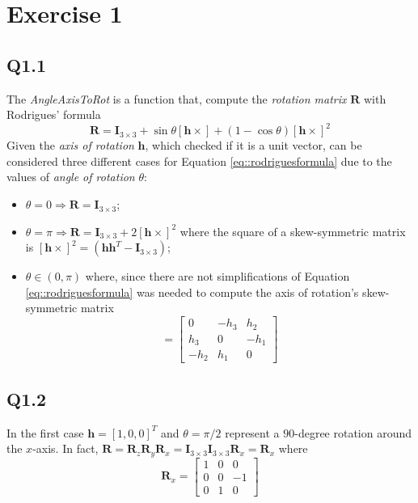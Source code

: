 \section{Exercise 1} \label{P1}
\subsection{Q1.1}
The \textit{AngleAxisToRot} is a function that, compute the \textit{rotation matrix} $\mathbf{R}$ with Rodrigues' formula 
\begin{equation}
	\mathbf{R} = \mathbf{I}_{3\times 3} + \sin{\theta}[\mathbf{h}\times] + (1 - \cos \theta)[\mathbf{h}\times]^2
	\label{eq::rodriguesformula}
\end{equation}
Given the \textit{axis of rotation} $\mathbf{h}$, which checked if it is a unit vector, can be considered three different cases for Equation \ref{eq::rodriguesformula} due to the values of \textit{angle of rotation} $\theta$:
\begin{itemize}
	\item $\theta = 0 \Rightarrow \mathbf{R} = \mathbf{I}_{3\times 3}$\space;
	\item $\theta = \pi \Rightarrow \mathbf{R} = \mathbf{I}_{3\times 3} + 2 [\mathbf{h}\times]^2$ where the square of a skew-symmetric matrix is $[\mathbf{h}\times]^2 = (\mathbf{h}\mathbf{h}^T -\mathbf{I}_{3\times 3})$\space;
	\item $\theta \in (0, \pi)$ where, since there are not simplifications of Equation \ref{eq::rodriguesformula} was needed to compute the axis of rotation's skew-symmetric matrix
		\begin{equation*}
			[\mathbf{h}\times] = \begin{bmatrix}
				0 & -h_3 & h_2 \\
				h_3 & 0 & -h_1 \\
				-h_2 & h_1 & 0
			\end{bmatrix}
	\end{equation*}
\end{itemize}

\subsection{Q1.2}
In the first case $\mathbf{h} = [1, 0, 0]^T$ and $\theta = \pi/2$ represent a $90$-degree rotation around the $x$-axis. In fact, $\mathbf{R}= \mathbf{R}_z\mathbf{R}_y\mathbf{R}_x =\mathbf{I}_{3\times 3}\mathbf{I}_{3\times 3}\mathbf{R}_x = \mathbf{R}_x$ where
\begin{equation*}
	\mathbf{R}_x = \begin{bmatrix}
				1 & 0 & 0 \\
				0 & 0 & -1 \\
				0 & 1 & 0
			\end{bmatrix}
\end{equation*}
